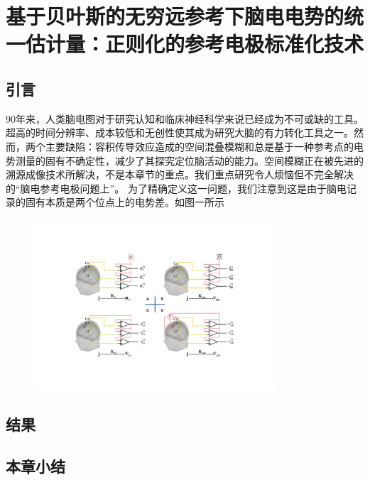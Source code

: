 \chapter{基于贝叶斯的无穷远参考下脑电电势的统一估计量：正则化的参考电极标准化技术}

\section{引言}
90年来，人类脑电图对于研究认知和临床神经科学来说已经成为不可或缺的工具。超高的时间分辨率、成本较低和无创性使其成为研究大脑的有力转化工具之一。然而，两个主要缺陷：容积传导效应造成的空间混叠模糊和总是基于一种参考点\cite{teplan2002fundamentals}的电势测量的固有不确定性，减少了其探究定位脑活动的能力。空间模糊正在被先进的溯源成像技术所解决，不是本章节的重点。我们重点研究令人烦恼但不完全解决的“脑电参考电极问题上”。
为了精确定义这一问题，我们注意到这是由于脑电记录的固有本质是两个位点上的电势差。如图一所示
\begin{figure}
	\includegraphics[width=0.8\textwidth,natwidth=610,natheight=642]{pic/3.1.pdf}
\end{figure}


\section{结果}

\section{本章小结}